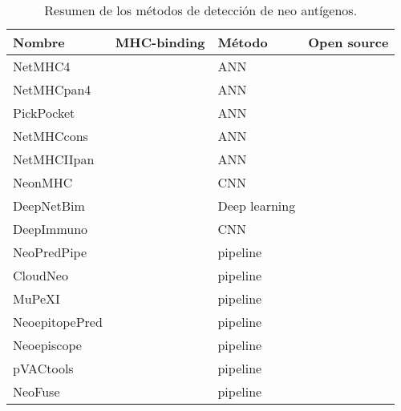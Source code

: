 \begin{table}[H]
	\centering
	\caption{Resumen de los métodos de detección de neo antígenos.}
	\label{tab:review}
	\begin{tabular}{llll}
		\hline
		\textbf{Nombre} & \textbf{MHC-binding} & \textbf{Método} & \textbf{Open source} \\ \hline
		NetMHC4         & \checkmark            & ANN             &                      \\
		NetMHCpan4      & \checkmark            & ANN             &                      \\
		PickPocket      & \checkmark            & ANN             &                      \\
		NetMHCcons      & \checkmark            & ANN             &                      \\
		NetMHCIIpan     & \checkmark            & ANN             &                      \\
		NeonMHC         & \checkmark            & CNN             &                      \\
		DeepNetBim      & \checkmark            & Deep learning   & \checkmark            \\
		DeepImmuno      & \checkmark            & CNN             &                      \\
		NeoPredPipe     &                      & pipeline        & \checkmark            \\
		CloudNeo        &                      & pipeline        &                      \\
		MuPeXI          &                      & pipeline        &                      \\
		NeoepitopePred  &                      & pipeline        &                      \\
		Neoepiscope     &                      & pipeline        &                      \\
		pVACtools       &                      & pipeline        & \checkmark            \\
		NeoFuse         &                      & pipeline        & \checkmark    \\   \hline    
	\end{tabular}
\end{table}
